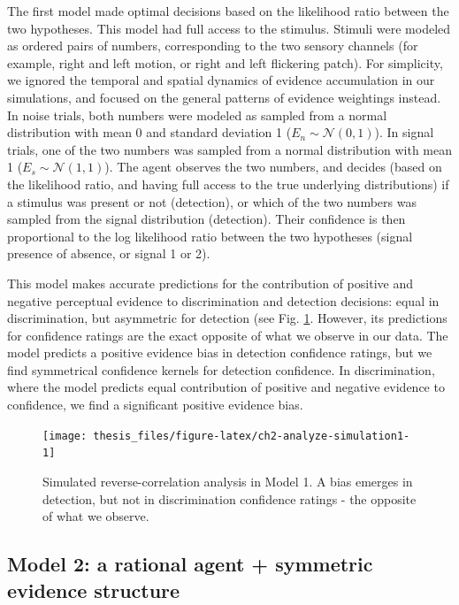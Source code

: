 \documentclass[12pt,twoside]{reedthesis}
\begin{document}
The first model made optimal decisions based on the likelihood ratio between the two hypotheses. This model had full access to the stimulus. Stimuli were modeled as ordered pairs of numbers, corresponding to the two sensory channels (for example, right and left motion, or right and left flickering patch). For simplicity, we ignored the temporal and spatial dynamics of evidence accumulation in our simulations, and focused on the general patterns of evidence weightings instead. In noise trials, both numbers were modeled as sampled from a normal distribution with mean 0 and standard deviation 1 (\(E_n\sim \mathcal{N}(0,1)\)). In signal trials, one of the two numbers was sampled from a normal distribution with mean 1 (\(E_s \sim \mathcal{N}(1,1)\)). The agent observes the two numbers, and decides (based on the likelihood ratio, and having full access to the true underlying distributions) if a stimulus was present or not (detection), or which of the two numbers was sampled from the signal distribution (detection). Their confidence is then proportional to the log likelihood ratio between the two hypotheses (signal presence of absence, or signal 1 or 2).

This model makes accurate predictions for the contribution of positive and negative perceptual evidence to discrimination and detection decisions: equal in discrimination, but asymmetric for detection (see Fig. \ref{fig:ch2-analyze-simulation1}. However, its predictions for confidence ratings are the exact opposite of what we observe in our data. The model predicts a positive evidence bias in detection confidence ratings, but we find symmetrical confidence kernels for detection confidence. In discrimination, where the model predicts equal contribution of positive and negative evidence to confidence, we find a significant positive evidence bias.
\begin{figure}
\texttt{[image: thesis\_files/figure-latex/ch2-analyze-simulation1-1]} \caption[Simulation results: Model 1]{Simulated reverse-correlation analysis in Model 1. A bias emerges in detection, but not in discrimination confidence ratings - the opposite of what we observe.}\label{fig:ch2-analyze-simulation1}
\end{figure}
\hypertarget{model-2-a-rational-agent-symmetric-evidence-structure}{%
\subsection{Model 2: a rational agent + symmetric evidence structure}\label{model-2-a-rational-agent-symmetric-evidence-structure}}
\end{document}
